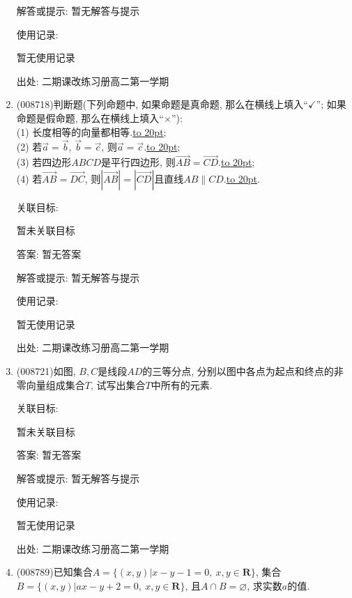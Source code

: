 \documentclass[10pt,a4paper]{article}
\newcommand{\blank}[1]{\underline{\hbox to #1pt{}}}
\begin{document}
\begin{enumerate}[1.]
解答或提示: 暂无解答与提示

使用记录:

暂无使用记录


出处: 二期课改练习册高二第一学期
\item { (008718)}判断题(下列命题中, 如果命题是真命题, 那么在横线上填入``$\checkmark$''; 如果命题是假命题, 那么在横线上填入``$\times$''):\\
(1) 长度相等的向量都相等.\blank{20};\\
(2) 若$\overrightarrow a=\overrightarrow b$, $\overrightarrow b=\overrightarrow c$, 则$\overrightarrow a=\overrightarrow c$.\blank{20};\\
(3) 若四边形$ABCD$是平行四边形, 则$\overrightarrow{AB}=\overrightarrow{CD}$.\blank{20};\\
(4) 若$\overrightarrow{AB}=\overrightarrow{DC}$, 则$|\overrightarrow{AB}|=|\overrightarrow{CD}|$且直线$AB\parallel CD$.\blank{20}.


关联目标:

暂未关联目标

答案: 暂无答案

解答或提示: 暂无解答与提示

使用记录:

暂无使用记录


出处: 二期课改练习册高二第一学期
\item { (008721)}如图, $B,C$是线段$AD$的三等分点, 分别以图中各点为起点和终点的非零向量组成集合$T$, 试写出集合$T$中所有的元素.
\begin{center}
\end{center}


关联目标:

暂未关联目标

答案: 暂无答案

解答或提示: 暂无解答与提示

使用记录:

暂无使用记录


出处: 二期课改练习册高二第一学期
\item { (008789)}已知集合$A=\{(x,y)|x-y-1=0,\ x,y\in \mathbf{R}\}$, 集合$B=\{(x,y)|ax-y+2=0,\ x,y\in \mathbf{R}\}$, 且$A\cap B=\varnothing$, 求实数$a$的值.



\end{enumerate}
\end{document}

